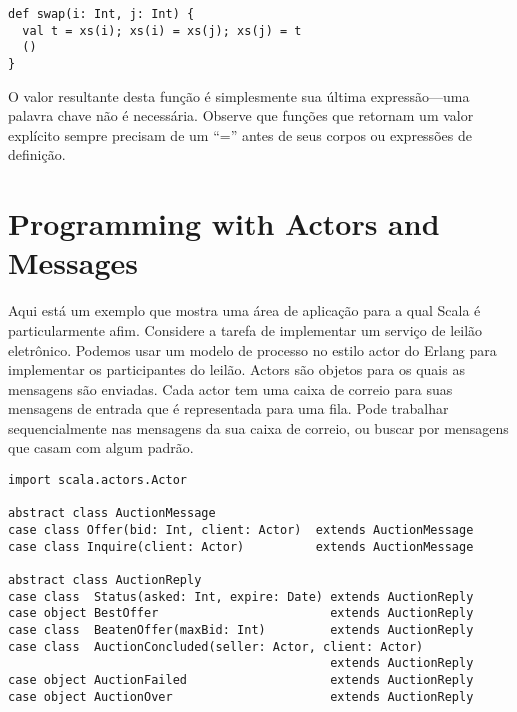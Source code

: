 \begin{lstlisting}
def swap(i: Int, j: Int) {
  val t = xs(i); xs(i) = xs(j); xs(j) = t
  ()
}
\end{lstlisting}

O valor resultante desta função é simplesmente sua última expressão---uma
palavra chave \lstinline@return@ não é necessária. Observe que funções 
que retornam um valor explícito sempre precisam de um ``='' antes de
seus corpos ou expressões de definição.

\chapter{Programming with Actors and Messages}
\label{chap:example-auction}
Aqui está um exemplo que mostra uma área de aplicação para a qual Scala 
é particularmente afim. Considere a tarefa de implementar um serviço
de leilão eletrônico. Podemos usar um modelo de processo no estilo 
actor do Erlang para implementar os participantes do leilão. Actors são 
objetos para os quais as mensagens são enviadas. Cada actor tem uma caixa de correio 
para suas mensagens de entrada que é representada para uma fila. Pode
trabalhar sequencialmente nas mensagens da sua caixa de correio, ou buscar 
por mensagens que casam com algum padrão. 
\begin{lstlisting}[style=floating,label=fig:simple-auction-msgs,caption=Message
    Classes for an Auction Service]
import scala.actors.Actor

abstract class AuctionMessage
case class Offer(bid: Int, client: Actor)  extends AuctionMessage
case class Inquire(client: Actor)          extends AuctionMessage

abstract class AuctionReply
case class  Status(asked: Int, expire: Date) extends AuctionReply
case object BestOffer                        extends AuctionReply
case class  BeatenOffer(maxBid: Int)         extends AuctionReply
case class  AuctionConcluded(seller: Actor, client: Actor) 
                                             extends AuctionReply
case object AuctionFailed                    extends AuctionReply
case object AuctionOver                      extends AuctionReply
\end{lstlisting}
